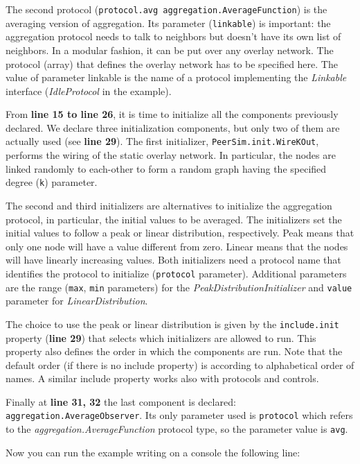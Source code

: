\documentclass[a4paper,11pt]{article}
\begin{document}
The second protocol (\texttt{protocol.avg aggregation.AverageFunction})
is the averaging version of aggregation. Its parameter (\texttt{linkable})
is important: the aggregation protocol needs to talk to neighbors
but doesn't have its own list of neighbors.
In a modular fashion, it can be put over any overlay network.
The protocol (array) that defines the overlay network has to be specified
here.
The value of parameter linkable is the name
of a protocol implementing  the \emph{Linkable} interface
(\emph{IdleProtocol}
in the example).

From \textbf{line 15 to line 26}, it is time to initialize all the
components previously declared. We declare three initialization components,
but only two of them are actually used (see \textbf{line 29}).
The first initializer, \texttt{PeerSim.init.WireKOut},
performs the wiring of the static overlay network. 
In particular, the nodes are linked
randomly to each-other to form a random graph having the specified
degree (\texttt{k}) parameter. 

The second and third initializers are alternatives to initialize the aggregation
protocol, in particular, the initial values to be averaged.
The initializers set the initial values to follow a peak or linear
distribution, respectively.
Peak means that only one node will have a value different from zero.
Linear means that the nodes will have linearly increasing values.
Both initializers need a protocol name that identifies the
protocol to initialize (\texttt{protocol} parameter).
Additional parameters are the range (\texttt{max}, \texttt{min}
parameters)
for the \emph{PeakDistributionInitializer} and \texttt{value}
parameter for \emph{LinearDistribution}. 

The choice to use the peak or linear distribution is given by the
\texttt{include.init} property (\textbf{line 29}) that selects which
initializers are 
allowed to run.
This property also defines the order in which the components are run.
Note that the default order (if there is no include property) is according
to alphabetical order of names.
A similar include property works also with protocols and controls.

Finally at \textbf{line 31, 32} the last component is declared:
\texttt{aggregation.AverageObserver}.
Its only parameter used is \texttt{protocol} which refers to the
\emph{aggregation.AverageFunction} protocol type, so the parameter
value is \texttt{avg}.

Now you can run the example writing on a console the following line:
\end{document}
